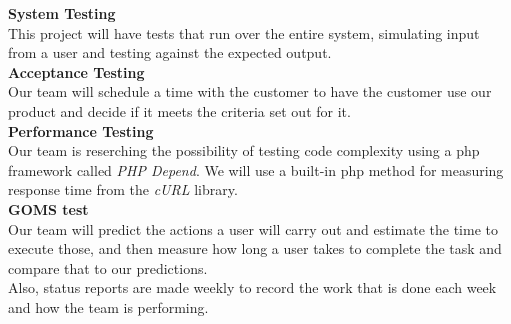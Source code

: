 \documentclass[11pt]{article}
\begin{document}
\hspace{-.5in} \textbf{System Testing} \\

This project will have tests that run over the entire system, simulating input from a user and testing against the expected output. \\

\hspace{-.5in} \textbf{Acceptance Testing} \\

Our team will schedule a time with the customer to have the customer use our product and decide if it meets the criteria set out for it. \\

\hspace{-.5in} \textbf{Performance Testing} \\

Our team is reserching the possibility of testing code complexity using a php framework called \textit{PHP Depend}. We will use a built-in php method
for measuring response time from the \textit{cURL} library. \\

\hspace{-.5in} \textbf{GOMS test} \\

Our team will predict the actions a user will carry out and estimate the time to execute those, and then measure how long a user takes to complete
the task and compare that to our predictions. \\

Also, status reports are made weekly to record the work that is done each week and how the team is performing.
\end{document}
